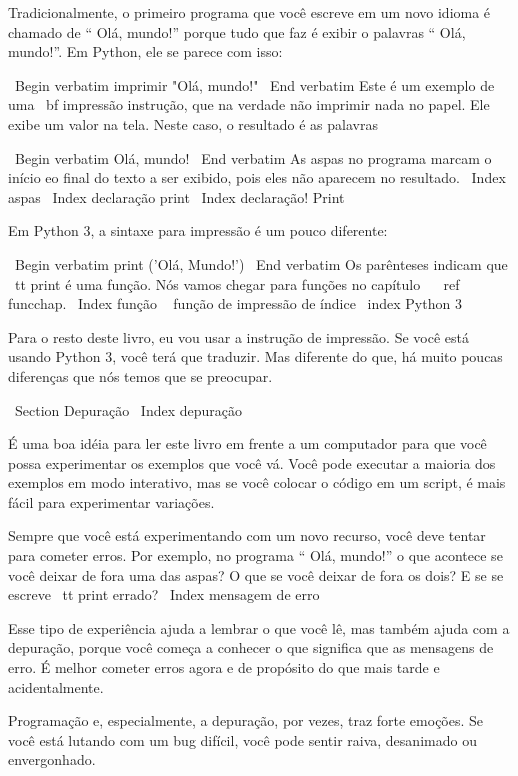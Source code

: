 \documentclass[10pt]{book}
\begin{document}
{Tradicionalmente, o primeiro programa que você escreve em um novo idioma
é chamado de `` Olá, mundo!'' porque tudo que faz é exibir o
palavras `` Olá, mundo!''. Em Python, ele se parece com isso:

\ Begin {verbatim}
imprimir "Olá, mundo!"
\ End {verbatim}
%
Este é um exemplo de uma {\ bf impressão instrução}, que
na verdade não imprimir nada no papel. Ele exibe um valor na
tela. Neste caso, o resultado é as palavras

\ Begin {verbatim}
Olá, mundo!
\ End {verbatim}
%
As aspas no programa marcam o início eo final
do texto a ser exibido, pois eles não aparecem no resultado.
\ Index {aspas}
\ Index {declaração print}
\ Index {declaração! Print}

Em Python 3, a sintaxe para impressão é um pouco diferente:

\ Begin {verbatim}
print ('Olá, Mundo!')
\ End {verbatim}
%
Os parênteses indicam que {\ tt print} é uma função. Nós vamos chegar
para funções no capítulo ~ \ ref {} funcchap.
\ Index {função} \ {} função de impressão de índice \ index {Python 3}

Para o resto deste livro, eu vou usar a instrução de impressão. Se você
está usando Python 3, você terá que traduzir. Mas diferente do
que, há muito poucas diferenças que nós temos que se preocupar.


\ Section {} Depuração
\ Index {depuração}

É uma boa idéia para ler este livro em frente a um computador para que você possa
experimentar os exemplos que você vá. Você pode executar a maioria dos exemplos em
modo interativo, mas se você colocar o código em um script, é mais fácil
para experimentar variações.

Sempre que você está experimentando com um novo recurso, você deve tentar
para cometer erros. Por exemplo, no programa `` Olá, mundo!''
o que acontece se você deixar de fora uma das aspas? O que
se você deixar de fora os dois? E se se escreve {\ tt print} errado?
\ Index {mensagem de erro}

Esse tipo de experiência ajuda a lembrar o que você lê, mas também ajuda
com a depuração, porque você começa a conhecer o que significa que as mensagens de erro.
É melhor cometer erros agora e de propósito do que mais tarde
e acidentalmente.

Programação e, especialmente, a depuração, por vezes, traz forte
emoções. Se você está lutando com um bug difícil, você pode
sentir raiva, desanimado ou envergonhado.

}
\end{document}
